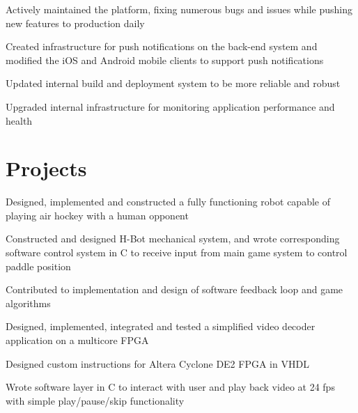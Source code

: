 \documentclass[letterpaper]{deedy-resume} %
\begin{document}
\begin{minipage}[t]{0.66\textwidth}
\sectionspace %



\begin{tightitemize}
\item Actively maintained the platform, fixing numerous bugs and issues while pushing new features to production daily
\item Created infrastructure for push notifications on the back-end system and modified the iOS and Android mobile clients to support push notifications
\item Updated internal build and deployment system to be more reliable and robust
\item Upgraded internal infrastructure for monitoring application performance and health
\end{tightitemize}



\section{Projects}

\begin{tightitemize}
\item Designed, implemented and constructed a fully functioning robot capable of playing air hockey with a human opponent
\item Constructed and designed H-Bot mechanical system, and wrote corresponding software control system in C to receive input from main game system to control paddle position
\item Contributed to implementation and design of software feedback loop and game algorithms
\end{tightitemize}

\begin{tightitemize}
\item Designed, implemented, integrated and tested a simplified video decoder application on a multicore FPGA
\item Designed custom instructions for Altera Cyclone DE2 FPGA in VHDL
\item Wrote software layer in C to interact with user and play back video at 24 fps with simple play/pause/skip functionality
\end{tightitemize}


\end{minipage}
\end{document}
